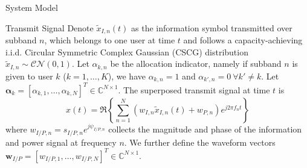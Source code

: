 \documentclass{IEEEtran}
\begin{document}
\begin{section}{System Model}
	\begin{subsection}{Transmit Signal}
		Denote $\tilde{x}_{I,n}(t)$ as the information symbol transmitted over subband $n$, which belongs to one user at time $t$ and follows a capacity-achieving i.i.d. Circular Symmetric Complex Gaussian (CSCG) distribution $\tilde{x}_{I,n}\sim\mathcal{CN}(0,1)$. Let $\alpha_{k,n}$ be the allocation indicator, namely if subband $n$ is given to user $k$ ($k=1,\dots,K$), we have $\alpha_{k,n}=1$ and $\alpha_{k',n}=0 \ \forall k' \ne k$. Let $\boldsymbol{\alpha}_k=[\alpha_{k,1},\dots,\alpha_{k,N}]^T \in \mathbb{C}^{N \times 1}$. The superposed transmit signal at time $t$ is
		\begin{equation}\label{eq:x}
			x(t)=\Re\left\{\sum_{n=1}^N\left({w_{I,n}\tilde{x}_{I,n}(t)}+w_{P,n}\right){e^{j2{\pi}{f_n}{t}}}\right\}
		\end{equation}
		where $w_{I/P,n}=s_{I/P,n}e^{j\psi_{I/P,n}}$ collects the magnitude and phase of the information and power signal at frequency $n$. We further define the waveform vectors $\boldsymbol{w}_{I/P}=[w_{I/P,1},\dots,w_{I/P,N}]^T \in \mathbb{C}^{N{\times}1}$.
	\end{subsection}


\end{section}
\end{document}
